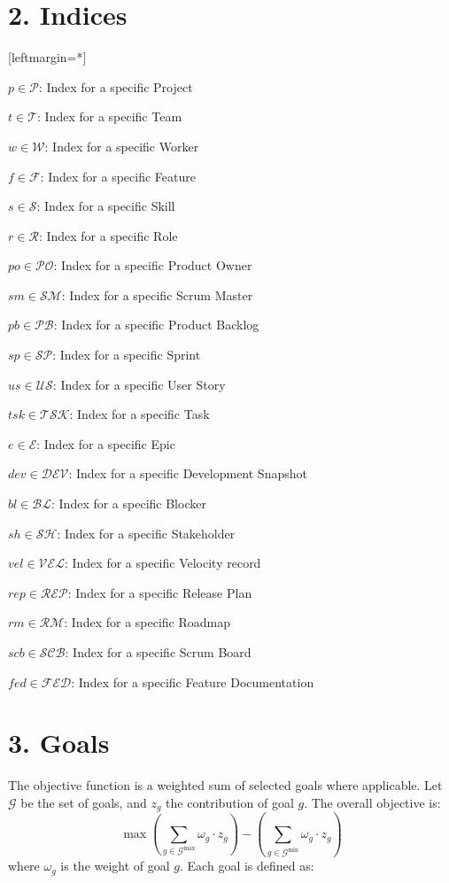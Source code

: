\documentclass[12pt]{article}
\begin{document}
\section{2. Indices}
[leftmargin=*]
    \item $ p \in \mathcal{P} $: Index for a specific Project
    \item $ t \in \mathcal{T} $: Index for a specific Team
    \item $ w \in \mathcal{W} $: Index for a specific Worker
    \item $ f \in \mathcal{F} $: Index for a specific Feature
    \item $ s \in \mathcal{S} $: Index for a specific Skill
    \item $ r \in \mathcal{R} $: Index for a specific Role
    \item $ po \in \mathcal{PO} $: Index for a specific Product Owner
    \item $ sm \in \mathcal{SM} $: Index for a specific Scrum Master
    \item $ pb \in \mathcal{PB} $: Index for a specific Product Backlog
    \item $ sp \in \mathcal{SP} $: Index for a specific Sprint
    \item $ us \in \mathcal{US} $: Index for a specific User Story
    \item $ tsk \in \mathcal{TSK} $: Index for a specific Task
    \item $ e \in \mathcal{E} $: Index for a specific Epic
    \item $ dev \in \mathcal{DEV} $: Index for a specific Development Snapshot
    \item $ bl \in \mathcal{BL} $: Index for a specific Blocker
    \item $ sh \in \mathcal{SH} $: Index for a specific Stakeholder
    \item $ vel \in \mathcal{VEL} $: Index for a specific Velocity record
    \item $ rep \in \mathcal{REP} $: Index for a specific Release Plan
    \item $ rm \in \mathcal{RM} $: Index for a specific Roadmap
    \item $ scb \in \mathcal{SCB} $: Index for a specific Scrum Board
    \item $ fed \in \mathcal{FED} $: Index for a specific Feature Documentation

\section{3. Goals}
The objective function is a weighted sum of selected goals where applicable. Let $ \mathcal{G} $ be the set of goals, and $ z_g $ the contribution of goal $ g $. The overall objective is:
\[
\max \left( \sum_{g \in \mathcal{G}^{\text{max}}} \omega_g \cdot z_g \right) - \left( \sum_{g \in \mathcal{G}^{\text{min}}} \omega_g \cdot z_g \right)
\]
where $ \omega_g $ is the weight of goal $ g $. Each goal is defined as:
\end{document}
